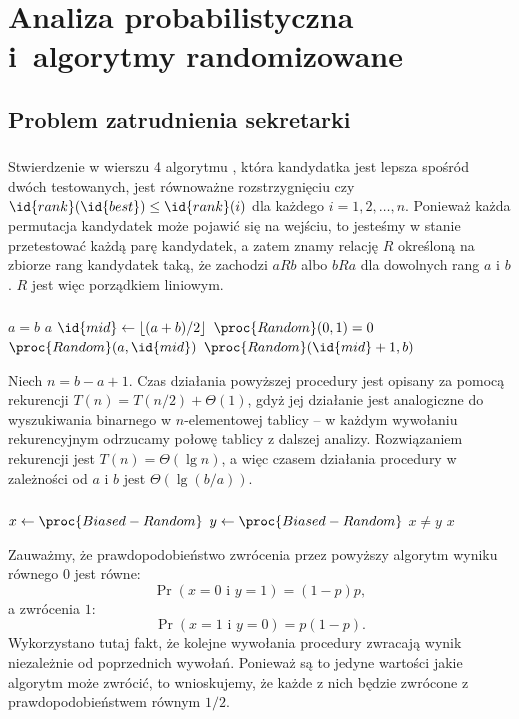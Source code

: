\chapter{Analiza probabilistyczna i~algorytmy randomizowane}

\section{Problem zatrudnienia sekretarki}

\subsection{} %
Stwierdzenie w wierszu 4 algorytmu , która kandydatka jest lepsza spośród dwóch testowanych, jest równoważne rozstrzygnięciu czy $\id{rank}(\id{best})\le\id{rank}(i)$ dla każdego $i=1,2,\dots,n$. Ponieważ każda permutacja kandydatek może pojawić się na wejściu, to jesteśmy w stanie przetestować każdą parę kandydatek, a zatem znamy relację $R$ określoną na zbiorze rang kandydatek taką, że zachodzi $aRb$ albo $bRa$ dla dowolnych rang $a$ i $b$. $R$ jest więc porządkiem liniowym.

\subsection{} %
\begin{codebox}
\li	\If $a=b$
\li		\Then
			\Return $a$
		\End
\li	$\id{mid}\gets\lfloor(a+b)/2\rfloor$
\li	\If $\proc{Random}(0,1)=0$
\li		\Then
			\Return $\proc{Random}(a,\id{mid})$
\li		\Else
			\Return $\proc{Random}(\id{mid}+1,b)$
		\End
\end{codebox}
Niech $n=b-a+1$. Czas działania powyższej procedury jest opisany za pomocą rekurencji $T(n)=T(n/2)+\Theta(1)$, gdyż jej działanie jest analogiczne do wyszukiwania binarnego w $n$-elementowej tablicy -- w każdym wywołaniu rekurencyjnym odrzucamy połowę tablicy z dalszej analizy. Rozwiązaniem rekurencji jest $T(n)=\Theta(\lg n)$, a więc czasem działania procedury  w zależności od $a$ i $b$ jest $\Theta(\lg (b/a))$.

\subsection{} %
\begin{codebox}
\li	\Repeat
		$x\gets\proc{Biased-Random}$
\li		$y\gets\proc{Biased-Random}$
\li	\Until $x\ne y$ \label{li:unbiased-repeat-end}
\li \Return $x$
\end{codebox}
Zauważmy, że prawdopodobieństwo zwrócenia przez powyższy algorytm wyniku równego $0$ jest równe:
\[
	\Pr(x=0\mbox{ i }y=1) = (1-p)p,
\]
a zwrócenia $1$:
\[
	\Pr(x=1\mbox{ i }y=0) = p(1-p).
\]
Wykorzystano tutaj fakt, że kolejne wywołania procedury  zwracają wynik niezależnie od poprzednich wywołań. Ponieważ są to jedyne wartości jakie algorytm może zwrócić, to wnioskujemy, że każde z nich będzie zwrócone z prawdopodobieństwem równym $1/2$.

